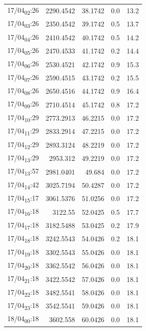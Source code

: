 \documentclass[11pt]{article}
\begin{document}
\begin{center}
\begin{tabular}{lrrrr}
17/04\textsubscript{02}:26 & 2290.4542 & 38.1742 & 0.0 & 13.2\\[0pt]
17/04\textsubscript{03}:26 & 2350.4542 & 39.1742 & 0.5 & 13.7\\[0pt]
17/04\textsubscript{04}:26 & 2410.4542 & 40.1742 & 0.5 & 14.2\\[0pt]
17/04\textsubscript{05}:26 & 2470.4533 & 41.1742 & 0.2 & 14.4\\[0pt]
17/04\textsubscript{06}:26 & 2530.4521 & 42.1742 & 0.9 & 15.3\\[0pt]
17/04\textsubscript{07}:26 & 2590.4515 & 43.1742 & 0.2 & 15.5\\[0pt]
17/04\textsubscript{08}:26 & 2650.4516 & 44.1742 & 0.9 & 16.4\\[0pt]
17/04\textsubscript{09}:26 & 2710.4514 & 45.1742 & 0.8 & 17.2\\[0pt]
17/04\textsubscript{10}:29 & 2773.2913 & 46.2215 & 0.0 & 17.2\\[0pt]
17/04\textsubscript{11}:29 & 2833.2914 & 47.2215 & 0.0 & 17.2\\[0pt]
17/04\textsubscript{12}:29 & 2893.3124 & 48.2219 & 0.0 & 17.2\\[0pt]
17/04\textsubscript{13}:29 & 2953.312 & 49.2219 & 0.0 & 17.2\\[0pt]
17/04\textsubscript{13}:57 & 2981.0401 & 49.684 & 0.0 & 17.2\\[0pt]
17/04\textsubscript{14}:42 & 3025.7194 & 50.4287 & 0.0 & 17.2\\[0pt]
17/04\textsubscript{15}:17 & 3061.5376 & 51.0256 & 0.0 & 17.2\\[0pt]
17/04\textsubscript{16}:18 & 3122.55 & 52.0425 & 0.5 & 17.7\\[0pt]
17/04\textsubscript{17}:18 & 3182.5488 & 53.0425 & 0.2 & 17.9\\[0pt]
17/04\textsubscript{18}:18 & 3242.5543 & 54.0426 & 0.2 & 18.1\\[0pt]
17/04\textsubscript{19}:18 & 3302.5543 & 55.0426 & 0.0 & 18.1\\[0pt]
17/04\textsubscript{20}:18 & 3362.5542 & 56.0426 & 0.0 & 18.1\\[0pt]
17/04\textsubscript{21}:18 & 3422.5542 & 57.0426 & 0.0 & 18.1\\[0pt]
17/04\textsubscript{22}:18 & 3482.5541 & 58.0426 & 0.0 & 18.1\\[0pt]
17/04\textsubscript{23}:18 & 3542.5541 & 59.0426 & 0.0 & 18.1\\[0pt]
18/04\textsubscript{00}:18 & 3602.558 & 60.0426 & 0.0 & 18.1\\[0pt]

\end{tabular}
\end{center}
\end{document}

